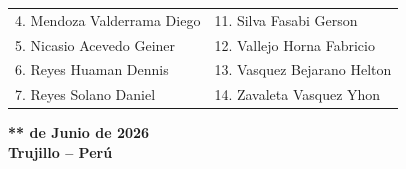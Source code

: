 \documentclass[10pt,a4paper]{book}
\begin{document}
\begin{titlepage}
\begin{center}
{\begin{tabular}{p{7cm} p{7cm}}
				4. Mendoza Valderrama Diego &
				11. Silva Fasabi Gerson \\
				
				5. Nicasio Acevedo Geiner &
				12. Vallejo Horna Fabricio \\
				
				6. Reyes Huaman Dennis &
				13. Vasquez Bejarano Helton \\
				
				7. Reyes Solano Daniel &
				14. Zavaleta Vasquez Yhon \\
			\end{tabular}
		}
			
			\vspace{10mm}
			
			{\Large \textbf{** de Junio de 2026}}\\
			\vspace{3mm}
			{\Large \textbf{Trujillo – Perú}}\\
			\vfill
			
		\end{center}
	\end{titlepage}
	
\end{document}
